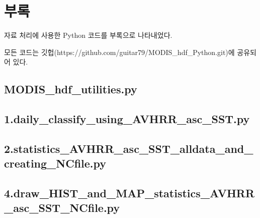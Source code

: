 
\section{부록}

자료 처리에 사용한 Python 코드를 부록으로 나타내었다. 

모든 코드는 깃헙(https://github.com/guitar79/MODIS\_hdf\_Python.git)에 공유되어 있다.

\subsection{MODIS\_hdf\_utilities.py}



\subsection{1.daily\_classify\_using\_AVHRR\_asc\_SST.py}


\subsection{2.statistics\_AVHRR\_asc\_SST\_alldata\_and\_creating\_NCfile.py}


\subsection{4.draw\_HIST\_and\_MAP\_statistics\_AVHRR\_asc\_SST\_NCfile.py}


